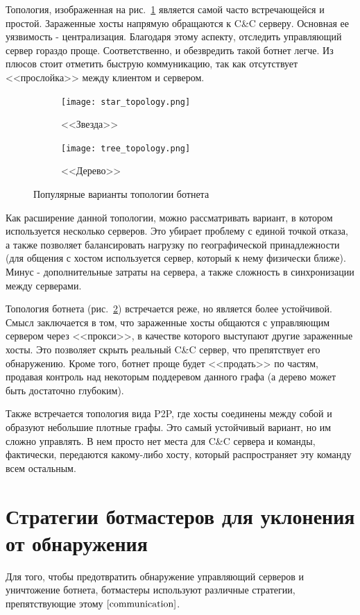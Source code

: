 \documentclass[a4paper,14pt]{extreport} %
\begin{document}
Топология, изображенная на рис.~\ref{fig:top1} является самой часто встречающейся и простой. Зараженные хосты напрямую обращаются к C\&C серверу. Основная ее уязвимость - централизация. Благодаря этому аспекту, отследить управляющий сервер гораздо проще. Соответственно, и обезвредить такой ботнет легче. Из плюсов стоит отметить быструю коммуникацию, так как отсутствует <<прослойка>> между клиентом и сервером.

\begin{figure}[H]
			
	\begin{subfigure}{0.5\textwidth}
		\texttt{[image: star\_topology.png]}
		\caption{<<Звезда>>}
		\label{fig:top1}
	\end{subfigure}
	\begin{subfigure}{0.5\textwidth}
		\texttt{[image: tree\_topology.png]}
		\caption{<<Дерево>>}
		\label{fig:top2}
	\end{subfigure}
			 
	\caption{Популярные варианты топологии ботнета}
	\label{fig:image2}
\end{figure}
Как расширение данной топологии, можно рассматривать вариант, в котором используется несколько серверов. Это убирает проблему с единой точкой отказа, а также позволяет балансировать нагрузку по географической принадлежности (для общения с хостом используется сервер, который к нему физически ближе). Минус - дополнительные затраты на сервера, а также сложность в синхронизации между серверами.
	
Топология ботнета (рис.~\ref{fig:top2}) встречается реже, но является более устойчивой. Смысл заключается в том, что зараженные хосты общаются с управляющим сервером через <<прокси>>, в качестве которого выступают другие зараженные хосты. Это позволяет скрыть реальный C\&C сервер, что препятствует его обнаружению. Кроме того, ботнет проще будет <<продать>> по частям, продавая контроль над некоторым поддеревом данного графа (а дерево может быть достаточно глубоким).
	
Также встречается топология вида P2P, где хосты соединены между собой и образуют небольшие плотные графы. Это самый устойчивый вариант, но им сложно управлять. В нем просто нет места для C\&C сервера и команды, фактически, передаются какому-либо хосту, который распространяет эту команду всем остальным.

\section{Стратегии ботмастеров для уклонения от обнаружения}
Для того, чтобы предотвратить обнаружение управляющий серверов и уничтожение ботнета, ботмастеры используют различные стратегии, препятствующие этому $\cite{communication}$.
\end{document}
